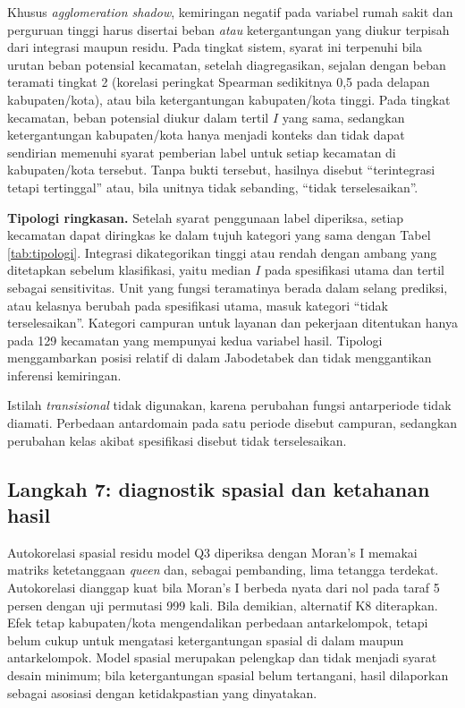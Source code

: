 \documentclass[12pt,a4paper,oneside,openany,indonesian]{report}
\begin{document}
Khusus \emph{agglomeration shadow}, kemiringan negatif pada variabel rumah
sakit dan perguruan tinggi harus disertai beban \emph{atau}
ketergantungan yang diukur terpisah dari integrasi maupun residu. Pada
tingkat sistem, syarat ini terpenuhi bila urutan beban potensial
kecamatan, setelah diagregasikan, sejalan dengan beban teramati tingkat
2 (korelasi peringkat Spearman sedikitnya 0,5 pada delapan
kabupaten/kota), atau bila ketergantungan kabupaten/kota tinggi. Pada
tingkat kecamatan, beban potensial diukur dalam tertil $I$ yang sama,
sedangkan ketergantungan kabupaten/kota hanya menjadi konteks dan tidak
dapat sendirian memenuhi syarat pemberian label untuk setiap kecamatan
di kabupaten/kota tersebut.
Tanpa bukti tersebut, hasilnya disebut ``terintegrasi tetapi
tertinggal'' atau, bila unitnya tidak sebanding, ``tidak terselesaikan''.

\textbf{Tipologi ringkasan.} Setelah syarat penggunaan label diperiksa, setiap kecamatan
dapat diringkas ke dalam tujuh kategori yang sama dengan Tabel
\ref{tab:tipologi}. Integrasi dikategorikan tinggi atau rendah dengan
ambang yang ditetapkan sebelum klasifikasi, yaitu median $I$ pada
spesifikasi utama dan tertil sebagai sensitivitas. Unit yang fungsi
teramatinya berada dalam selang prediksi, atau kelasnya berubah pada
spesifikasi utama, masuk kategori ``tidak terselesaikan''. Kategori
campuran untuk layanan dan pekerjaan ditentukan hanya pada 129 kecamatan
yang mempunyai kedua variabel hasil. Tipologi menggambarkan posisi relatif di
dalam Jabodetabek dan tidak menggantikan inferensi kemiringan.

Istilah \emph{transisional} tidak digunakan, karena perubahan fungsi
antarperiode tidak diamati. Perbedaan antardomain pada satu periode
disebut campuran, sedangkan perubahan kelas akibat spesifikasi disebut
tidak terselesaikan.

\subsection{Langkah 7: diagnostik spasial dan ketahanan
hasil}\label{langkah-7-diagnostik-spasial-dan-ketahanan-hasil}

Autokorelasi spasial residu model Q3 diperiksa dengan Moran's I memakai
matriks ketetanggaan \emph{queen} dan, sebagai pembanding, lima tetangga
terdekat. Autokorelasi dianggap kuat bila Moran's I berbeda nyata dari
nol pada taraf 5 persen dengan uji permutasi 999 kali. Bila demikian,
alternatif K8 diterapkan. Efek tetap kabupaten/kota mengendalikan
perbedaan antarkelompok, tetapi belum cukup untuk mengatasi
ketergantungan spasial di dalam maupun antarkelompok. Model spasial
merupakan pelengkap dan tidak menjadi syarat desain minimum; bila
ketergantungan spasial belum tertangani, hasil dilaporkan sebagai
asosiasi dengan ketidakpastian yang dinyatakan.
\end{document}

